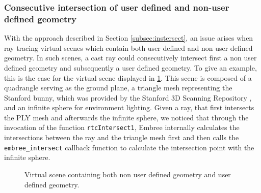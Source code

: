 \subsubsection{Consecutive intersection of user defined and non-user defined geometry}

With the approach described in Section \ref{subsec:instersect}, an issue arises when ray tracing virtual scenes which contain both user defined and non user defined geometry. In such scenes, a cast ray could consecutively intersect first a non user defined geometry and subsequently a user defined geometry. To give an example, this is the case for the virtual scene displayed in \ref{fig:no_bunny}. This scene is composed of a quadrangle serving as the ground plane, a triangle mesh representing the Stanford bunny, which was provided by the Stanford 3D Scanning Repository \cite{plyRepo} , and an infinite sphere for environment lighting.
Given a ray, that first intersects the PLY mesh and afterwards the infinite sphere, we noticed that through the invocation of the function \texttt{rtcIntersect1}, Embree internally calculates the intersections between the ray and the triangle mesh first and then calls the \texttt{embree\_intersect} callback function to calculate the intersection point with the infinite sphere.


\begin{figure}[!tbp]
	\centering
	\hfil
	\caption{Virtual scene containing both non user defined geometry and user defined geometry.}
	\label{fig:no_bunny}
\end{figure}

